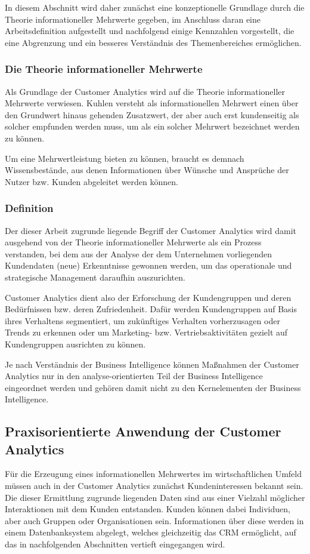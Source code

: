 In diesem Abschnitt wird daher zunächst eine konzeptionelle Grundlage durch die Theorie informationeller Mehrwerte gegeben, im Anschluss daran eine Arbeitsdefinition aufgestellt und nachfolgend einige Kennzahlen vorgestellt, die eine Abgrenzung und ein besseres Verständnis des Themenbereiches ermöglichen.

\subsubsection{Die Theorie informationeller Mehrwerte}
Als Grundlage der Customer Analytics wird auf die Theorie informationeller Mehrwerte \cite{kuhlen1995} verwiesen. Kuhlen versteht als informationellen Mehrwert einen über den Grundwert hinaus gehenden Zusatzwert, der aber auch erst kundenseitig als solcher empfunden werden muss, um als ein solcher Mehrwert bezeichnet werden zu können.

Um eine Mehrwertleistung bieten zu können, braucht es demnach Wissensbestände, aus denen Informationen über Wünsche und Ansprüche der Nutzer bzw. Kunden abgeleitet werden können.

\subsubsection{Definition}
Der dieser Arbeit zugrunde liegende Begriff der Customer Analytics wird damit ausgehend von der Theorie informationeller Mehrwerte als ein Prozess verstanden, bei dem aus der Analyse der dem Unternehmen vorliegenden Kundendaten (neue) Erkenntnisse gewonnen werden, um das operationale und strategische Management daraufhin auszurichten. \cite{kumar2018}

Customer Analytics dient also der Erforschung der Kundengruppen und deren Bedürfnissen bzw. deren Zufriedenheit. Dafür werden Kundengruppen auf Basis ihres Verhaltens segmentiert, um zukünftiges Verhalten vorherzusagen oder Trends zu erkennen oder um Marketing- bzw. Vertriebsaktivitäten gezielt auf Kundengruppen ausrichten zu können. \cite{gartner2020}

Je nach Verständnis der Business Intelligence können Maßnahmen der Customer Analytics nur in den analyse-orientierten Teil der Business Intelligence eingeordnet werden und gehören damit nicht zu den Kernelementen der Business Intelligence.

\subsection{Praxisorientierte Anwendung der Customer Analytics}
Für die Erzeugung eines informationellen Mehrwertes im wirtschaftlichen Umfeld müssen auch in der Customer Analytics zunächst Kundeninteressen bekannt sein. Die dieser Ermittlung zugrunde liegenden Daten sind aus einer Vielzahl möglicher Interaktionen mit dem Kunden entstanden. Kunden können dabei Individuen, aber auch Gruppen oder Organisationen sein. Informationen über diese werden in einem Datenbanksystem abgelegt, welches gleichzeitig das CRM ermöglicht, auf das in nachfolgenden Abschnitten vertieft eingegangen wird.

